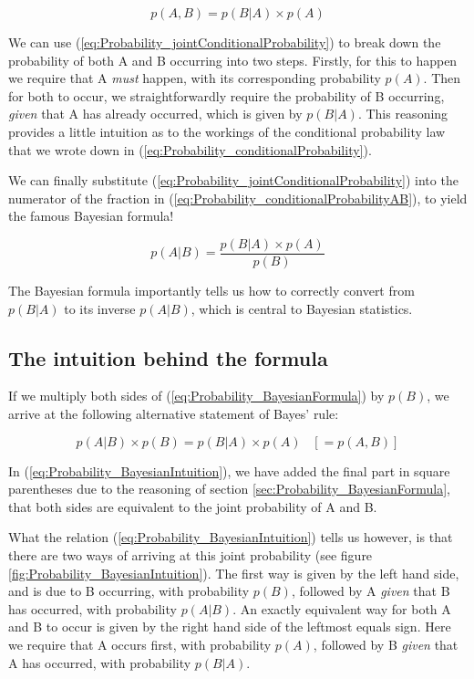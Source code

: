 \documentclass[11pt,fullpage]{book}
\begin{document}
\begin{equation}\label{eq:Probability_jointConditionalProbability}
p(A,B) = p(B|A)\times p(A)
\end{equation}

We can use (\ref{eq:Probability_jointConditionalProbability}) to break down the probability of both A and B occurring into two steps. Firstly, for this to happen we require that A \textit{must} happen, with its corresponding probability $p(A)$. Then for both to occur, we straightforwardly require the probability of B occurring, \textit{given} that A has already occurred, which is given by $p(B|A)$. This reasoning provides a little intuition as to the workings of the conditional probability law that we wrote down in (\ref{eq:Probability_conditionalProbability}).

We can finally substitute (\ref{eq:Probability_jointConditionalProbability}) into the numerator of the fraction in (\ref{eq:Probability_conditionalProbabilityAB}), to yield the famous Bayesian formula!

\begin{equation}\label{eq:Probability_BayesianFormula}
p(A|B) = \frac{p(B|A)\times p(A)}{p(B)}
\end{equation}

The Bayesian formula importantly tells us how to correctly convert from $p(B|A)$ to its inverse $p(A|B)$, which is central to Bayesian statistics.

\subsection{The intuition behind the formula}
If we multiply both sides of (\ref{eq:Probability_BayesianFormula}) by $p(B)$, we arrive at the following alternative statement of Bayes' rule:

\begin{equation}\label{eq:Probability_BayesianIntuition}
p(A|B)\times p(B) = p(B|A)\times p(A) \;\;\;[= p(A,B)]
\end{equation}

In (\ref{eq:Probability_BayesianIntuition}), we have added the final part in square parentheses due to the reasoning of section \ref{sec:Probability_BayesianFormula}, that both sides are equivalent to the joint probability of A and B.

What the relation (\ref{eq:Probability_BayesianIntuition}) tells us however, is that there are two ways of arriving at this joint probability (see figure \ref{fig:Probability_BayesianIntuition}). The first way is given by the left hand side, and is due to B occurring, with probability $p(B)$, followed by A \textit{given} that B has occurred, with probability $p(A|B)$. An exactly equivalent way for both A and B to occur is given by the right hand side of the leftmost equals sign. Here we require that A occurs first, with probability $p(A)$, followed by B \textit{given} that A has occurred, with probability $p(B|A)$.
\end{document}
